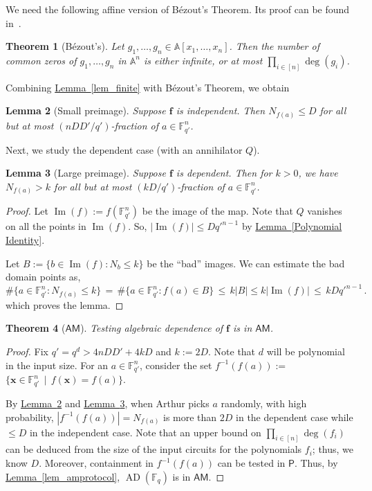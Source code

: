 \documentclass[11pt]{article}
\numberwithin{equation}{section}
\newtheorem{theorem}{Theorem}[section]
\newtheorem{lemma}[theorem]{Lemma}
\theoremstyle{definition}
\theoremstyle{plain}
\newcommand{\cclass}[1]{\textsf{#1}}
\newcommand{\expref}[2]{\hyperref[#2]{#1~\ref{#2}}}
\newcommand{\F}{\mathbb{F}}
\newcommand{\aff}{\mathbb{A}}
\DeclareMathOperator{\im}{\mathrm{Im}}
\newcommand{\Pclass}{\cclass{P}\xspace}  %
\newcommand{\AM}{\cclass{AM}\xspace}  %
\DeclareMathOperator{\AD}{\mathrm{AD}\xspace} %
\begin{document}
We need the following affine version of B\'ezout's Theorem. Its proof can be found in~\cite[Theorem~3.1]{Sch95}.
\begin{theorem}[B\'ezout's]
 Let $g_1,\dots,g_n\in \aff[x_1,\dots,x_n]$. Then the number of common zeros of $g_1,\dots,g_n$ in $\aff^n$ is either infinite, or at most $\prod_{i\in[n]} \deg(g_i)$.
\end{theorem}

Combining \expref{Lemma}{lem_finite} with B\'ezout's Theorem, we obtain
\begin{lemma}[Small preimage]\label{lem_bpre}
Suppose $\mathbf f$
%
is  %
independent.
Then $N_{f(a)}\leq D$ for all but at most $(nDD'/q')$-fraction of $a\in\F_{q'}^n$.
\end{lemma}

Next, we study the dependent case (with an annihilator $Q$).

\begin{lemma}[Large preimage]\label{lem_coamdep}
Suppose $\mathbf f$
%
is  %
dependent.
Then for $k>0$, we have $N_{f(a)}>k$ for all but at most $(kD/q')$-fraction of $a\in \F_{q'}^n$.
\end{lemma}
\begin{proof}
 Let $\im(f):= f(\F_{q'}^n)$ be the image of the map. Note that $Q$ vanishes on all the points in $\im(f)$. So, $|\im(f)| \leq Dq'^{n-1}$ by 
 \expref{Lemma}{Polynomial Identity}. %
 
Let $B:= \{b\in \im(f): N_b\leq k\}$ be the ``bad'' images. We can estimate the bad domain points as, 
\[
\#\{a\in \F_{q'}^n: N_{f(a)}\leq k\} \,=\, \#\{a\in \F_{q'}^n: f(a)\in B\} \,\le\,  k|B| \le k|\im(f)| \,\le\, k D q'^{n-1} \,.
\]
which proves the lemma.
\end{proof}


\begin{theorem}[$\AM$]\label{thm_am}
Testing algebraic dependence of $\mathbf f$ is in $\AM$.
\end{theorem}
\begin{proof}
Fix $q'=q^d>4nDD'+4kD$ and $k:=2D$. Note that $d$ will be polynomial in the input size.
For an $a\in \F_{q'}^n$, consider the set 
$f^{-1}(f(a)) :=$ $\{\mathbf x \in \F_{q'}^n \,\mid\, f(\mathbf x) = f(a) \}$.

%
By \expref{Lemma}{lem_bpre} and \expref{Lemma}{lem_coamdep}, when %
Arthur picks $a$ randomly, with high probability, $|f^{-1}(f(a))|= N_{f(a)}$ is more than $2D$ in the dependent case while $\le D$ in the independent case. Note that an upper bound on $\prod_{i\in [n]}\deg(f_i)$ can be deduced from the size of the input circuits for 
%
the polynomials $f_i$; %
thus, we know $D$. Moreover, containment in $f^{-1}(f(a))$ can be tested in 
%
$\Pclass$. %
Thus, by \expref{Lemma}{lem_amprotocol},
%
$\AD(\F_q)$    %
is in $\AM$.
\end{proof}
\end{document}
